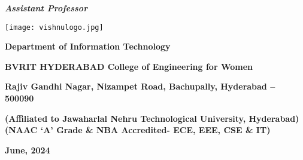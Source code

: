 \documentclass[12pt, English]{article}
\begin{document}
\begin{titlepage}
\begin{center}
\textbf{\large \textit {Assistant Professor}}\\
\begin{center}
\texttt{[image: vishnulogo.jpg]}
\end{center}
\begin{large}
\textbf{Department of Information Technology}\\
\end{large}
\begin{Large}
\textbf{BVRIT HYDERABAD College of Engineering for Women}\\
\end{Large}
\begin{normalsize}
\textbf{ Rajiv Gandhi Nagar, Nizampet Road, Bachupally, Hyderabad – 500090}

\textbf{(Affiliated to Jawaharlal Nehru Technological University, Hyderabad)}\\

\textbf{(NAAC ‘A’ Grade \& NBA Accredited- ECE, EEE, CSE \& IT)}\\

\end{normalsize}
\begin{large}
\vspace{0.01in}
\textbf{ June, 2024}\\
\end{large}
\end{center}
\end{titlepage}
\end{document}
